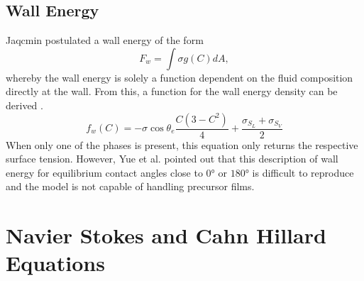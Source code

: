 \subsection{Wall Energy}
Jaqcmin \cite{jacqmin1999CalculationTwoPhaseNavier} postulated a wall energy of the form
\begin{equation}
    F_w=\int \sigma g(C)dA, 
\end{equation}
whereby the wall energy is solely a function dependent on the fluid composition directly at the wall. From this, a function for the wall energy density can be derived \cite{jacqmin2000ContactlineDynamicsDiffuse}.
\begin{equation}
    f_w(C)=-\sigma \cos\theta_e \frac{C(3-C^2)}{4} + \frac{\sigma_{S_L}+ \sigma_{S_V}}{2}
\end{equation}
When only one of the phases is present, this equation only returns the respective surface tension. However, Yue et al. \cite{yue2011CanDiffuseinterfaceModels} pointed out that this description of wall energy for equilibrium contact angles close to $0°$ or $180°$ is difficult to reproduce and the model is not capable of handling precursor films. 

\section{Navier Stokes and Cahn Hillard Equations}

